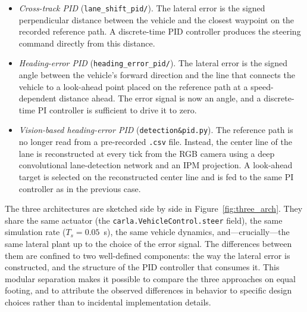 \begin{itemize}
    \item \emph{Cross-track PID} (\texttt{lane\_shift\_pid/}). The lateral error is the signed perpendicular distance between the vehicle and the closest waypoint on the recorded reference path. A discrete-time PID controller produces the steering command directly from this distance.
    \item \emph{Heading-error PID} (\texttt{heading\_error\_pid/}). The lateral error is the signed angle between the vehicle's forward direction and the line that connects the vehicle to a look-ahead point placed on the reference path at a speed-dependent distance ahead. The error signal is now an angle, and a discrete-time PI controller is sufficient to drive it to zero.
    \item \emph{Vision-based heading-error PID} (\texttt{detection\&pid.py}). The reference path is no longer read from a pre-recorded \texttt{.csv} file. Instead, the center line of the lane is reconstructed at every tick from the RGB camera using a deep convolutional lane-detection network and an \acs{IPM} projection. A look-ahead target is selected on the reconstructed center line and is fed to the same PI controller as in the previous case.
\end{itemize}

The three architectures are sketched side by side in Figure~\ref{fig:three_arch}. They share the same actuator (the \texttt{carla.VehicleControl.steer} field), the same simulation rate ($T_s = 0.05$~s), the same vehicle dynamics, and---crucially---the same lateral plant up to the choice of the error signal. The differences between them are confined to two well-defined components: the way the lateral error is constructed, and the structure of the PID controller that consumes it. This modular separation makes it possible to compare the three approaches on equal footing, and to attribute the observed differences in behavior to specific design choices rather than to incidental implementation details.


